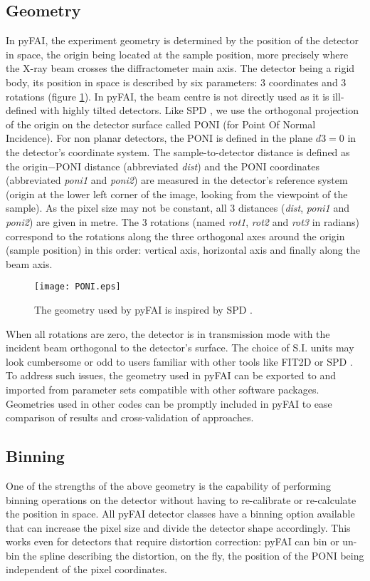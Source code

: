 \documentclass{iucr}
\begin{document}
\subsection{Geometry}
In pyFAI, the experiment geometry is determined by the position of the
detector in space, the origin being located at the sample position, more precisely where the
X-ray beam crosses the diffractometer main axis.
The detector being a rigid body, its position in space is described by
six parameters: 3 coordinates and 3 rotations (figure \ref{PONI}).
In pyFAI, the beam centre is not directly used as it is ill-defined with
highly tilted detectors.
Like SPD \cite{spd}, we use the orthogonal projection of the origin on
the detector surface called PONI (for Point Of Normal Incidence).
For non planar detectors, the PONI is defined in the plane $d3=0$ in
the detector's coordinate system.
The sample-to-detector distance is defined as the origin$-$PONI distance
(abbreviated \textit{dist}) and the PONI coordinates (abbreviated
\textit{poni1} and \textit{poni2}) are measured in the detector's reference
system (origin at the lower left corner of the image, looking from the
viewpoint of the sample).
As the pixel size may not be constant, all 3 distances (\textit{dist},
\textit{poni1} and \textit{poni2}) are given in metre.
The 3 rotations (named \textit{rot1}, \textit{rot2} and \textit{rot3} in
radians)
correspond to the rotations along the three orthogonal axes around the origin
(sample position) in this order:
vertical axis, horizontal axis and finally along the beam axis.

\begin{figure}
\label{PONI}
\begin{center}
\texttt{[image: PONI.eps]}
\caption{The geometry used by pyFAI is inspired by SPD \cite{spd}.}
\end{center}
\end{figure}

When all rotations are zero, the detector is in transmission mode with the
incident beam orthogonal to the detector's surface.
The choice of S.I. units may look cumbersome or odd to users familiar
with other tools like FIT2D \cite{fit2d} or SPD \cite{spd}.
To address such issues, the geometry used in pyFAI can be
exported to and imported from parameter sets compatible with other software
packages.
Geometries used in other codes can be promptly included in pyFAI to ease
comparison of results and cross-validation of approaches.

\subsection{Binning}
One of the strengths of the above geometry is the capability of performing
binning operations on the detector without having to re-calibrate or
re-calculate the position in space.
All pyFAI detector classes have a binning option available that can increase the
pixel size and divide the detector shape accordingly.
This works even for detectors that require distortion correction: pyFAI can bin
or un-bin the spline describing the distortion, on the fly, the position of the
PONI being independent of the pixel coordinates.
\end{document}
